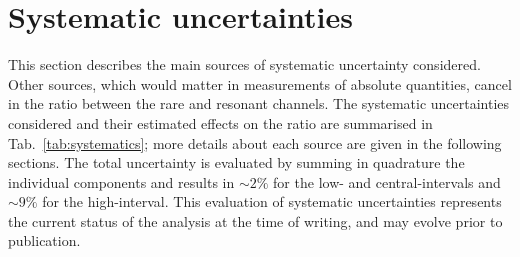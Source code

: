 \section{Systematic uncertainties}
\label{sec:systematics}

This section describes the main sources of systematic uncertainty considered.
Other sources, which would matter in measurements of absolute quantities,
cancel in the ratio between the rare and resonant channels.
The systematic uncertainties considered and their estimated effects on the \RKst
ratio are summarised in Tab.~\ref{tab:systematics}; more details about each source are 
given in the following sections. The total uncertainty is evaluated by summing in quadrature 
the individual components and results in $\sim  2\%$ for the low- and central-\qsq intervals
and $\sim  9\%$ for the high-\qsq interval. 
This evaluation of systematic uncertainties represents the current status of 
the analysis at the time of writing, and may evolve prior to publication.

\vspace{0.5cm}

